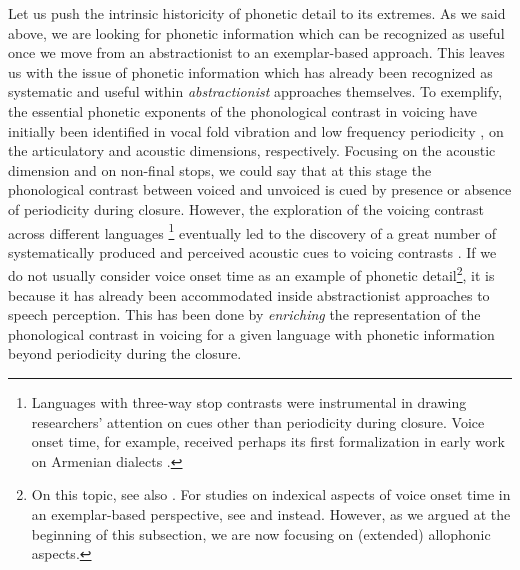 Let us push the intrinsic historicity of phonetic detail to its extremes. As we said above, we are looking for phonetic information which can be recognized as useful once we move from an abstractionist to an exemplar-based approach. This leaves us with the issue of phonetic information which has already been recognized as systematic and useful within \textit{abstractionist} approaches themselves. To exemplify, the essential phonetic exponents of the phonological contrast in voicing \citep{trubeckoj1939grundzuege} have initially been identified in vocal fold vibration and low frequency periodicity \citep{jakobson1952preliminaries}, on the articulatory and acoustic dimensions, respectively. Focusing on the acoustic dimension and on non-final stops, we could say that at this stage the phonological contrast between voiced and unvoiced is cued by presence or absence of periodicity during closure. However, the exploration of the voicing contrast across different languages \citep{lisker1964crosslanguage}\footnote{Languages with three-way stop contrasts were instrumental in drawing researchers' attention on cues other than periodicity during closure. Voice onset time, for example, received perhaps its first formalization in early work on Armenian dialects \citep{adjarian1899explosives}.} eventually led to the discovery of a great number of systematically produced and perceived acoustic cues to voicing contrasts \citep{lisker1986voicing}. If we do not usually consider voice onset time as an example of phonetic detail\footnote{On this topic, see also \citet{vanalphen2006effect}. For studies on indexical aspects of voice onset time in an exemplar-based perspective, see \citet{theodore2009characteristics} and \citet{levi2010priming} instead. However, as we argued at the beginning of this subsection, we are now focusing on (extended) allophonic aspects.}, it is because it has already been accommodated inside abstractionist approaches to speech perception. This has been done by \textit{enriching} the representation of the phonological contrast in voicing for a given language with phonetic information beyond periodicity during the closure. 

